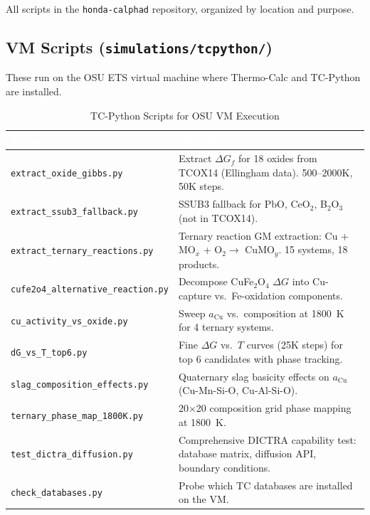 \documentclass[11pt]{article}
\begin{document}
All scripts in the \texttt{honda-calphad} repository, organized by location and purpose.

\subsection{VM Scripts (\texttt{simulations/tcpython/})}

These run on the OSU ETS virtual machine where Thermo-Calc and TC-Python are installed.

\begin{table}[H]
\caption{TC-Python Scripts for OSU VM Execution}
\label{tab:vm_scripts}
\centering
\renewcommand{\arraystretch}{1.15}
\footnotesize
\begin{tabular}{|p{2.6in}|p{3.4in}|}
\hline
\rowcolor{headercolor}
\textcolor{white}{\textbf{Script}} & \textcolor{white}{\textbf{Purpose}} \\
\hline
\texttt{extract\_oxide\_gibbs.py} & Extract $\Delta G_f$ for 18 oxides from TCOX14 (Ellingham data). 500--2000K, 50K steps. \\
\hline
\rowcolor{altrow}
\texttt{extract\_ssub3\_fallback.py} & SSUB3 fallback for PbO, CeO$_2$, B$_2$O$_3$ (not in TCOX14). \\
\hline
\texttt{extract\_ternary\_reactions.py} & Ternary reaction GM extraction: Cu + MO$_x$ + O$_2 \to$ CuMO$_y$. 15 systems, 18 products. \\
\hline
\rowcolor{altrow}
\texttt{cufe2o4\_alternative\_reaction.py} & Decompose CuFe$_2$O$_4$ $\Delta G$ into Cu-capture vs.\ Fe-oxidation components. \\
\hline
\texttt{cu\_activity\_vs\_oxide.py} & Sweep $a_{\text{Cu}}$ vs.\ composition at \SI{1800}{\kelvin} for 4 ternary systems. \\
\hline
\rowcolor{altrow}
\texttt{dG\_vs\_T\_top6.py} & Fine $\Delta G$ vs.\ $T$ curves (25K steps) for top 6 candidates with phase tracking. \\
\hline
\texttt{slag\_composition\_effects.py} & Quaternary slag basicity effects on $a_{\text{Cu}}$ (Cu-Mn-Si-O, Cu-Al-Si-O). \\
\hline
\rowcolor{altrow}
\texttt{ternary\_phase\_map\_1800K.py} & 20$\times$20 composition grid phase mapping at \SI{1800}{\kelvin}. \\
\hline
\texttt{test\_dictra\_diffusion.py} & Comprehensive DICTRA capability test: database matrix, diffusion API, boundary conditions. \\
\hline
\rowcolor{altrow}
\texttt{check\_databases.py} & Probe which TC databases are installed on the VM. \\

\end{tabular}
\end{table}
\end{document}
